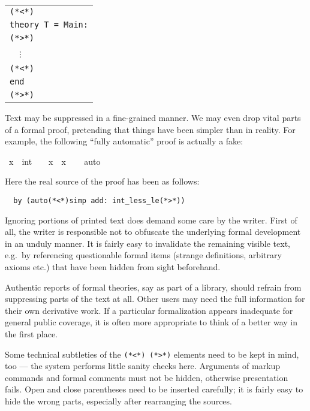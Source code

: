 \begin{isabellebody}
\begin{isamarkuptext}
  \medskip

  \begin{tabular}{l}
  \verb,(,\verb,*,\verb,<,\verb,*,\verb,), \\
  \texttt{theory T = Main:} \\
  \verb,(,\verb,*,\verb,>,\verb,*,\verb,), \\
  ~~$\vdots$ \\
  \verb,(,\verb,*,\verb,<,\verb,*,\verb,), \\
  \texttt{end} \\
  \verb,(,\verb,*,\verb,>,\verb,*,\verb,), \\
  \end{tabular}

  \medskip

  Text may be suppressed in a fine-grained manner.  We may even drop
  vital parts of a formal proof, pretending that things have been
  simpler than in reality.  For example, the following ``fully
  automatic'' proof is actually a fake:%
\end{isamarkuptext}%
\isamarkuptrue%
\ {\isachardoublequote}x\ {\isasymnoteq}\ {\isacharparenleft}{}{\isacharcolon}{\isacharcolon}int{\isacharparenright}\ {\isasymLongrightarrow}\ {}\ {\isacharless}\ x\ {\isacharasterisk}\ x{\isachardoublequote}\isanewline
\ \ \isamarkupfalse%
\ {\isacharparenleft}auto{\isacharparenright}\isamarkupfalse%
%
\begin{isamarkuptext}%
\noindent Here the real source of the proof has been as follows:

\begin{verbatim}
  by (auto(*<*)simp add: int_less_le(*>*))
\end{verbatim}

  \medskip Ignoring portions of printed text does demand some care by
  the writer.  First of all, the writer is responsible not to
  obfuscate the underlying formal development in an unduly manner.  It
  is fairly easy to invalidate the remaining visible text, e.g.\ by
  referencing questionable formal items (strange definitions,
  arbitrary axioms etc.) that have been hidden from sight beforehand.

  Authentic reports of formal theories, say as part of a library,
  should refrain from suppressing parts of the text at all.  Other
  users may need the full information for their own derivative work.
  If a particular formalization appears inadequate for general public
  coverage, it is often more appropriate to think of a better way in
  the first place.

  \medskip Some technical subtleties of the
  \verb,(,\verb,*,\verb,<,\verb,*,\verb,),~\verb,(,\verb,*,\verb,>,\verb,*,\verb,),
  elements need to be kept in mind, too --- the system performs little
  sanity checks here.  Arguments of markup commands and formal
  comments must not be hidden, otherwise presentation fails.  Open and
  close parentheses need to be inserted carefully; it is fairly easy
  to hide the wrong parts, especially after rearranging the sources.%
\end{isamarkuptext}%
\isamarkuptrue%
\isamarkupfalse%
\end{isabellebody}%
